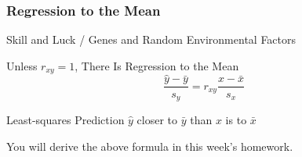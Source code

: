 \documentclass{beamer}
\begin{document}
%
%
%
%
%
%
%
%
%
%
%
%
%
%
%
%

\begin{frame}
\frametitle{Regression to the Mean}

\begin{block}{Skill and Luck / Genes and Random Environmental Factors}\end{block}


\begin{block}{Unless $r_{xy}=1$, There Is Regression to the Mean}
$$\frac{\hat{y} - \bar{y}}{{s_y}} = r_{xy} \frac{x - \bar{x}}{s_x}$$
\end{block}

\begin{alertblock}{Least-squares Prediction $\hat{y}$ closer to $\bar{y}$ than $x$ is to $\bar{x}$}
\end{alertblock}
You will derive the above formula in this week's homework.
\end{frame}
%
%
%
\end{document}
